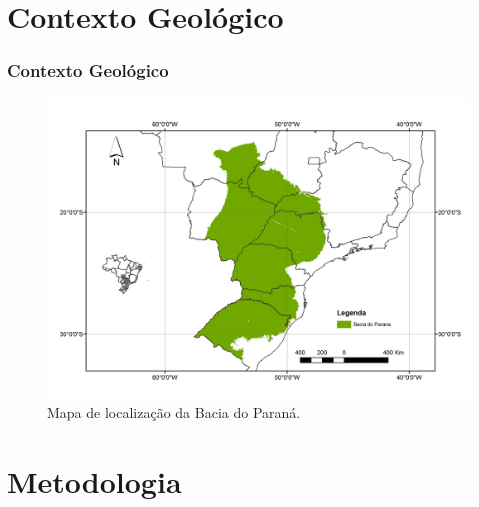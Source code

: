 \documentclass[10pt]{beamer} %
\begin{document}

\section{Contexto Geológico}

\begin{frame}
	\frametitle{Contexto Geológico}
	\begin{figure}[H]
		\centering
			\includegraphics[scale=0.3]{Imagens/BaciaParana.jpg}
		\caption{Mapa de localização da Bacia do Paraná. }
		\label{mapa geologico}
	\end{figure}
\end{frame}




\section{Metodologia}
\end{document}
